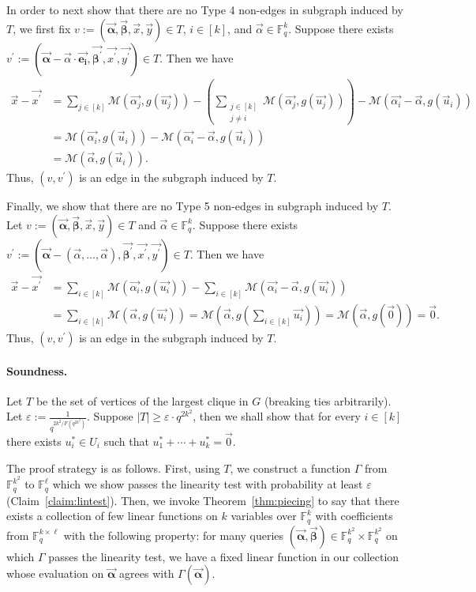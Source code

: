\documentclass[11pt]{article}
\newcommand{\F}{\mathbb{F}}
\renewcommand{\ge}{ \geqslant}
\newcommand{\alphab}{\vec{\bm{\alpha}}}
\newcommand{\betab}{\vec{\bm{\beta}}}
\newcommand{\M}{\mathcal{M}}
\begin{document}
In order to next show that there are no Type 4 non-edges in subgraph induced by $T$, we first fix $v:=(\alphab,\betab,\vec{x},\vec{y})\in T$, $i\in [k]$, and $\vec{\alpha}\in \F_q^k$. Suppose there exists $v^{\prime}:=(\alphab-\vec{\alpha}\cdot \vec{\bm{e_i}},\vec{\bm{\beta^{\prime}}},\vec{x^{\prime}},\vec{y^{\prime}})\in T$. Then we have 
\begin{align*}
\vec{x}-\vec{x^{\prime}}&=\sum_{j\in[k]} \M(\vec{\alpha_j},g(\vec{u_j}))-\left(\sum_{\substack{j\in[k]\\j\neq i}} \M(\vec{\alpha_j},g(\vec{u_j}))\right)-\M(\vec{\alpha_i}-\vec{\alpha},g(\vec{u}_i))\\
&=\M(\vec{\alpha_i},g(\vec{u}_i))-\M(\vec{\alpha_i}-\vec{\alpha},g(\vec{u}_i))\\
&=\M(\vec{\alpha},g(\vec{u}_i)).
\end{align*} 
Thus, $(v,v^{\prime})$ is an edge in the subgraph induced by $T$. 

Finally, we show that there are no Type 5 non-edges in subgraph induced by $T$. Let $v:=(\alphab,\betab,\vec{x},\vec{y})\in T$ and $\vec{\alpha}\in \F_q^k$. Suppose there exists $v^{\prime}:=(\alphab-(\vec{\alpha},\ldots ,\vec{\alpha}),\vec{\bm{\beta^{\prime}}},\vec{x^{\prime}},\vec{y^{\prime}})\in T$. Then we have 
\begin{align*}
\vec{x}-\vec{x^{\prime}}&=\sum_{i\in[k]} \M(\vec{\alpha_i},g(\vec{u_i}))-\sum_{i\in[k]} \M(\vec{\alpha_i}-\vec{\alpha},g(\vec{u_i}))\\
&=\sum_{i\in[k]} \M(\vec{\alpha},g(\vec{u_i}))
= \M\left(\vec{\alpha},g\left(\sum_{i\in[k]}\vec{u_i}\right)\right)
= \M(\vec{\alpha},g(\vec{0}))
= \vec{0}.
\end{align*} 
Thus, $(v,v^{\prime})$ is an edge in the subgraph induced by $T$. 

\paragraph{Soundness.}
Let $T$ be the set of vertices of the largest clique in $G$ (breaking ties arbitrarily). 
Let $\varepsilon:=\frac{1}{q^{{2k^2}/{F\left(q^{2k^2}\right)}}}$. 
Suppose  $|T|\ge \varepsilon\cdot q^{2k^2}$, then we shall show that for every $i\in[k]$ there exists $u_i^\ast\in U_i$ such that $u_1^\ast+\cdots +u_k^\ast=\vec{0}$.    
 


The proof strategy is as follows. First, using $T$, we construct a function $\Gamma$ from $\F_q^{k^2}$ to $\F_q^\ell$ which we show passes the linearity test with probability at least $\varepsilon$ (Claim~\ref{claim:lintest}). Then, we invoke Theorem~\ref{thm:piecing} to say that there exists a collection of few linear functions on $k$ variables over $\F_q^k$ with coefficients from $\F_q^{k\times \ell}$ with the following property: for many queries $(\vec{\bm \alpha},\vec{\bm\beta})\in \F_q^{ k^2}\times \F_q^{ k^2}$ on which $\Gamma$ passes the linearity test, we have   a fixed linear function in our collection whose evaluation on $\vec{\bm\alpha}$ agrees with  $\Gamma(\vec{\bm\alpha})$.
\end{document}
